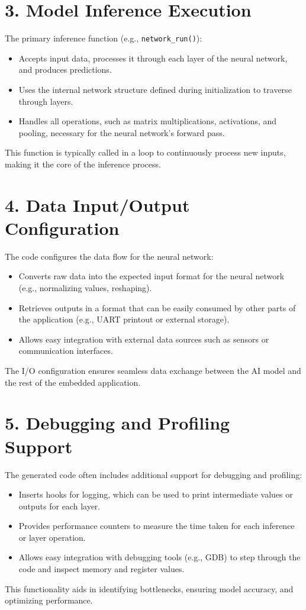 \documentclass{article}
\begin{document}
\section*{3. Model Inference Execution}
The primary inference function (e.g., \texttt{network\_run()}):
\begin{itemize}
    \item Accepts input data, processes it through each layer of the neural network, and produces predictions.
    \item Uses the internal network structure defined during initialization to traverse through layers.
    \item Handles all operations, such as matrix multiplications, activations, and pooling, necessary for the neural network’s forward pass.
\end{itemize}
This function is typically called in a loop to continuously process new inputs, making it the core of the inference process.

\section*{4. Data Input/Output Configuration}
The code configures the data flow for the neural network:
\begin{itemize}
    \item Converts raw data into the expected input format for the neural network (e.g., normalizing values, reshaping).
    \item Retrieves outputs in a format that can be easily consumed by other parts of the application (e.g., UART printout or external storage).
    \item Allows easy integration with external data sources such as sensors or communication interfaces.
\end{itemize}
The I/O configuration ensures seamless data exchange between the AI model and the rest of the embedded application.

\section*{5. Debugging and Profiling Support}
The generated code often includes additional support for debugging and profiling:
\begin{itemize}
    \item Inserts hooks for logging, which can be used to print intermediate values or outputs for each layer.
    \item Provides performance counters to measure the time taken for each inference or layer operation.
    \item Allows easy integration with debugging tools (e.g., GDB) to step through the code and inspect memory and register values.
\end{itemize}
This functionality aids in identifying bottlenecks, ensuring model accuracy, and optimizing performance.
\end{document}
